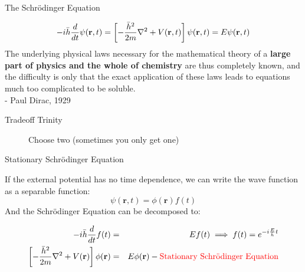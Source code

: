 \documentclass[aspectratio=169]{beamer}
\let \vec \mathbf
\begin{document}
\begin{frame}{The Schr\"odinger Equation}

\begin{equation}
\large
    -i\bar{h}\frac{d}{dt}\psi(\vec{r},t)=\left[-\frac{\bar{h}^2}{2m}\nabla^2 + V(\vec{r},t)\right]\psi(\vec{r}, t) = E\psi(\vec{r},t)
\end{equation}
The underlying physical laws necessary for the mathematical theory of a \textbf{large part of physics and the whole of chemistry} are thus completely known, and the difficulty is only that the exact application of these laws leads to equations much too complicated to be soluble.\\
- Paul Dirac, 1929

\end{frame}


\begin{frame}{Tradeoff Trinity}
\begin{figure}
    \centering
    \caption{Choose two (sometimes you only get one)}
\end{figure}

\end{frame}


\begin{frame}{Stationary Schr\"odinger Equation}

If the external potential has no time dependence, we can write the wave function as a separable function:
\begin{equation*}
\psi(\vec{r},t)=\phi(\vec{r})f(t)
\end{equation*}
And the Schrödinger Equation can be decomposed to:

\begin{eqnarray*}
    -i\bar{h}\frac{d}{dt}f(t) & = & Ef(t) \implies f(t) = e^{-i\frac{E}{\bar{h}}t}\\
    \left[-\frac{\bar{h}^2}{2m}\nabla^2 + V(\vec{r})\right]\phi(\vec{r}) & = & E\phi(\vec{r}) - \mbox{\textcolor{red}{Stationary Schr\"odinger Equation}}
\end{eqnarray*}

\end{frame}
\end{document}
